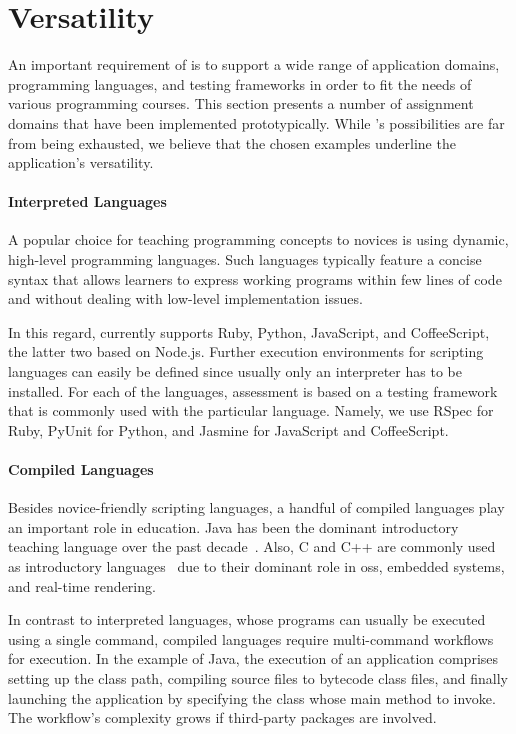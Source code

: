 \section{Versatility}\label{section:versatility}

An important requirement of \tool is to support a wide range of application domains, programming languages, and testing frameworks in order to fit the needs of various programming courses. This section presents a number of assignment domains that have been implemented prototypically. While \tool's possibilities are far from being exhausted, we believe that the chosen examples underline the application's versatility.

\paragraph{Interpreted Languages}

A popular choice for teaching programming concepts to novices is using dynamic, high-level programming languages. Such languages typically feature a concise syntax that allows learners to express working programs within few lines of code and without dealing with low-level implementation issues.

In this regard, \tool currently supports Ruby, Python, JavaScript, and CoffeeScript, the latter two based on Node.js. Further execution environments for scripting languages can easily be defined since usually only an interpreter has to be installed. For each of the languages, assessment is based on a testing framework that is commonly used with the particular language. Namely, we use RSpec for Ruby, PyUnit for Python, and Jasmine for JavaScript and CoffeeScript.

\paragraph{Compiled Languages}

Besides novice-friendly scripting languages, a handful of compiled languages play an important role in education. Java has been the dominant introductory teaching language over the past decade~\cite{guo2014python}. Also, C and C++ are commonly used as introductory languages~\cite{ala2004supporting,vogel2014quality} due to their dominant role in \glspl{os}, embedded systems, and real-time rendering.

In contrast to interpreted languages, whose programs can usually be executed using a single command, compiled languages require multi-command workflows for execution. In the example of Java, the execution of an application comprises setting up the class path, compiling source files to bytecode class files, and finally launching the application by specifying the class whose main method to invoke. The workflow's complexity grows if third-party packages are involved.

